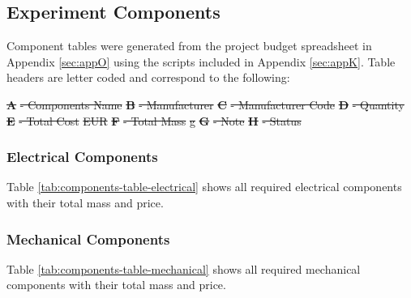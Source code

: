 \documentclass[a4paper,12pt,twoside]{article}
\providecommand{\DIFdeltex}[1]{{\protect\color{red}\sout{#1}}}                      %
\providecommand{\DIFdelbegin}{} %
\providecommand{\DIFdelend}{} %
\providecommand{\DIFdel}[1]{\texorpdfstring{\DIFdeltex{#1}}{}} %
\newcommand{\DIFscaledelfig}{0.5}
\newlength{\DIFdelgraphicswidth} %
\newlength{\DIFdelgraphicsheight} %
\newcommand{\DIFdelincludegraphics}[2][]{%
\sbox{\DIFdelgraphicsbox}{\DIFOincludegraphics[#1]{#2}}%
\settoboxwidth{\DIFdelgraphicswidth}{\DIFdelgraphicsbox} %
\settoboxtotalheight{\DIFdelgraphicsheight}{\DIFdelgraphicsbox} %
\scalebox{\DIFscaledelfig}{%
\parbox[b]{\DIFdelgraphicswidth}{\usebox{\DIFdelgraphicsbox}\\[-\baselineskip] \rule{\DIFdelgraphicswidth}{0em}}\llap{\resizebox{\DIFdelgraphicswidth}{\DIFdelgraphicsheight}{%
\setlength{\unitlength}{\DIFdelgraphicswidth}%
\begin{picture}(1,1)%
\thicklines\linethickness{2pt} %
{\color[rgb]{1,0,0}\put(0,0){\framebox(1,1){}}}%
{\color[rgb]{1,0,0}\put(0,0){\line( 1,1){1}}}%
{\color[rgb]{1,0,0}\put(0,1){\line(1,-1){1}}}%
\end{picture}%
}\hspace*{3pt}}} %
} %
\DeclareRobustCommand{\DIFdelbegin}{\DIFOdelbegin \let\includegraphics\DIFdelincludegraphics} %
\DeclareRobustCommand{\DIFdelend}{\DIFOaddend \let\includegraphics\DIFOincludegraphics} %
\begin{document}
\raggedbottom
\begin{landscape}
\subsection{Experiment Components} \label{components}
\label{sec:experiment-components}

Component tables were generated from the project budget spreadsheet in Appendix \ref{sec:appO} using the scripts included in Appendix \ref{sec:appK}. Table headers are letter coded and correspond to the following:

\DIFdelbegin \textbf{\DIFdel{A}} %
\DIFdel{- Components Name}%
\textbf{\DIFdel{B}} %
\DIFdel{- Manufacturer}%
\textbf{\DIFdel{C}} %
\DIFdel{- Manufacturer Code}%
\textbf{\DIFdel{D}} %
\DIFdel{- Quantity}%
\textbf{\DIFdel{E}} %
\DIFdel{- Total Cost }%
\DIFdel{EUR}%
\textbf{\DIFdel{F}} %
\DIFdel{- Total Mass }%
\DIFdel{g}%
\textbf{\DIFdel{G}} %
\DIFdel{- Note}%
\textbf{\DIFdel{H}} %
\DIFdel{- Status}%

\DIFdelend \subsubsection{Electrical Components}

Table \ref{tab:components-table-electrical} shows all required electrical components with their total mass and price.\\




\end{landscape}

\begin{landscape}

\subsubsection{Mechanical Components}

Table \ref{tab:components-table-mechanical} shows all required mechanical components with their total mass and price.\\




\raggedbottom
\end{landscape}
\end{document}
